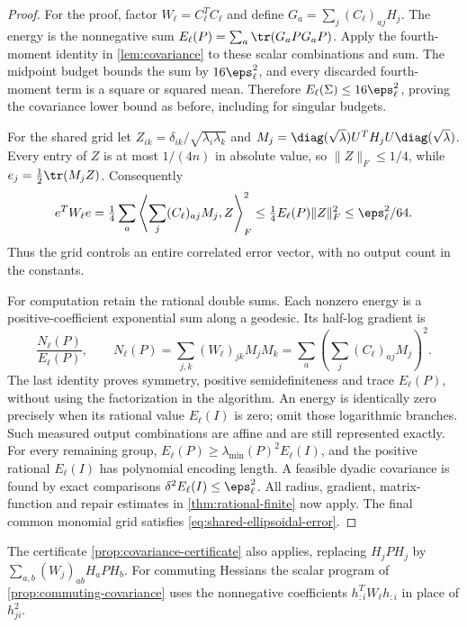 \begin{proof}
For the proof, factor $W_\ell=C_\ell^TC_\ell$ and define
$G_a=\sum_j(C_\ell)_{aj}H_j$. The energy is the nonnegative sum
$E_\ell(P)=\sum_a\tr(G_aPG_aP)$. Apply the fourth-moment identity
in \cref{lem:covariance} to these scalar combinations and sum. The
midpoint budget bounds the sum by $16\eps_\ell^2$, and every discarded
fourth-moment term is a square or squared mean. Therefore
$E_\ell(\Sigma)\le16\eps_\ell^2$, proving the covariance lower bound
as before, including for singular budgets.

For the shared grid let
$Z_{ik}=\delta_{ik}/\sqrt{\lambda_i\lambda_k}$ and
$M_j=\diag(\sqrt\lambda)U^TH_jU\diag(\sqrt\lambda)$. Every entry of
$Z$ is at most $1/(4n)$ in absolute value, so $\|Z\|_F\le1/4$, while
$e_j=\frac12\tr(M_jZ)$. Consequently
\begin{equation}\label{eq:shared-ellipsoidal-error}
 e^TW_\ell e
 =\tfrac14\sum_a\left\langle\sum_j(C_\ell)_{aj}M_j,Z\right\rangle_F^2
 \le\tfrac14E_\ell(P)\|Z\|_F^2\le\eps_\ell^2/64.
\end{equation}
Thus the grid controls an entire correlated error vector, with no output
count in the constants.

For computation retain the rational double sums. Each nonzero energy
is a positive-coefficient exponential sum along a geodesic. Its half-log
gradient is
\[
 \frac{N_\ell(P)}{E_\ell(P)},\qquad
 N_\ell(P)=\sum_{j,k}(W_\ell)_{jk}M_jM_k
       =\sum_a\left(\sum_j(C_\ell)_{aj}M_j\right)^2.
\]
The last identity proves symmetry, positive semidefiniteness and trace
$E_\ell(P)$, without using the factorization in the algorithm. An energy
is identically zero precisely when its rational value $E_\ell(I)$ is
zero; omit those logarithmic branches. Such measured output combinations
are affine and are still represented exactly. For every remaining group,
$E_\ell(P)\ge\lambda_{\min}(P)^2E_\ell(I)$, and the positive rational
$E_\ell(I)$ has polynomial encoding length. A feasible dyadic covariance
is found by exact comparisons $\delta^2E_\ell(I)\le\eps_\ell^2$.
All radius, gradient, matrix-function and repair estimates in
\cref{thm:rational-finite} now apply. The final common monomial grid
satisfies \eqref{eq:shared-ellipsoidal-error}.
\end{proof}

The certificate \cref{prop:covariance-certificate} also applies, replacing
$H_jPH_j$ by $\sum_{a,b}(W_j)_{ab}H_aPH_b$. For commuting Hessians the
scalar program of \cref{prop:commuting-covariance} uses the nonnegative
coefficients $h_{:i}^TW_\ell h_{:i}$ in place of $h_{ji}^2$.

